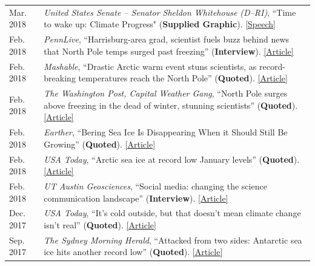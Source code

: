 \documentclass[margin,line,palatino,courier,10pt]{res}
\begin{document}
\begin{resume}
\begin{tabular}{@{}p{0.9in}p{4in}}
Mar. 2018 & \textit{United States Senate -- Senator Sheldon Whitehouse (D--RI)}, ``Time to wake up: Climate Progress" (\textbf{Supplied Graphic}). \href{https://www.youtube.com/watch?v=C_E5OQgt2SE}{[Speech]}\\
Feb. 2018 & \textit{PennLive}, ``Harrisburg-area grad, scientist fuels buzz behind news that North Pole temps surged past freezing'' (\textbf{Interview}). \href{http://www.pennlive.com/news/2018/02/harrisburg-area_scientist_is_b.html}{[Article]}\\
Feb. 2018 & \textit{Mashable}, ``Drastic Arctic warm event stuns scientists, as record-breaking temperatures reach the North Pole'' (\textbf{Quoted}). \href{https://mashable.com/2018/02/26/arctic-heat-wave-north-pole-february-sea-ice/?utm_cid=hp-h-2#jZ.Ip1wPjkqD}{[Article]}\\
Feb. 2018 & \textit{The Washington Post, Capital Weather Gang}, ``North Pole surges above freezing in the dead of winter, stunning scientists'' (\textbf{Quoted}). \href{https://www.washingtonpost.com/news/capital-weather-gang/wp/2018/02/26/north-pole-surges-above-freezing-in-the-dead-of-winter-stunning-scientists/?utm_term=.6025384d6bf1}{[Article]}\\
Feb. 2018 & \textit{Earther}, ``Bering Sea Ice Is Disappearing When it Should Still Be Growing'' (\textbf{Quoted}). \href{https://earther.com/bering-sea-ice-is-disappearing-at-a-time-when-it-should-1823193914}{[Article]}\\
Feb. 2018 & \textit{USA Today}, ``Arctic sea ice at record low January levels'' (\textbf{Quoted}). \href{https://www.usatoday.com/story/weather/2018/02/20/arctic-sea-ice-record-low-january-levels/355738002/}{[Article]}\\
Feb. 2018 & \textit{UT Austin Geosciences}, ``Social media: changing the science communication landscape'' (\textbf{Interview}). \href{https://www.jsg.utexas.edu/science-yall/social-media-landscape/}{[Article]}\\
Dec. 2017 & \textit{USA Today}, ``It's cold outside, but that doesn't mean climate change isn't real'' (\textbf{Quoted}). \href{https://www.usatoday.com/story/weather/2017/12/28/its-cold-outside-but-doesnt-mean-climate-change-isnt-real/987948001/}{[Article]}\\
Sep. 2017 & \textit{The Sydney Morning Herald}, ``Attacked from two sides: Antarctic sea ice hits another record low'' (\textbf{Quoted}). \href{http://www.smh.com.au/environment/climate-change/attacked-from-two-sides-antarctic-sea-ice-hits-another-record-low-20170926-gyouuc.html}{[Article]}\\

\end{tabular}
\end{resume}
\end{document}
